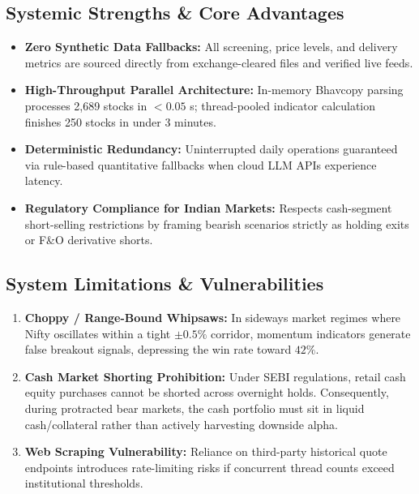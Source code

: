 \documentclass[11pt,a4paper]{article}
\begin{document}
\subsection{Systemic Strengths \& Core Advantages}
\begin{itemize}[leftmargin=*]
    \item \textbf{Zero Synthetic Data Fallbacks:} All screening, price levels, and delivery metrics are sourced directly from exchange-cleared files and verified live feeds.
    \item \textbf{High-Throughput Parallel Architecture:} In-memory Bhavcopy parsing processes 2,689 stocks in $< 0.05$ s; thread-pooled indicator calculation finishes 250 stocks in under 3 minutes.
    \item \textbf{Deterministic Redundancy:} Uninterrupted daily operations guaranteed via rule-based quantitative fallbacks when cloud LLM APIs experience latency.
    \item \textbf{Regulatory Compliance for Indian Markets:} Respects cash-segment short-selling restrictions by framing bearish scenarios strictly as holding exits or F\&O derivative shorts.
\end{itemize}

\subsection{System Limitations \& Vulnerabilities}
\begin{enumerate}[leftmargin=*]
    \item \textbf{Choppy / Range-Bound Whipsaws:} In sideways market regimes where Nifty oscillates within a tight $\pm 0.5\%$ corridor, momentum indicators generate false breakout signals, depressing the win rate toward $42\%$.
    \item \textbf{Cash Market Shorting Prohibition:} Under SEBI regulations, retail cash equity purchases cannot be shorted across overnight holds. Consequently, during protracted bear markets, the cash portfolio must sit in liquid cash/collateral rather than actively harvesting downside alpha.
    \item \textbf{Web Scraping Vulnerability:} Reliance on third-party historical quote endpoints introduces rate-limiting risks if concurrent thread counts exceed institutional thresholds.
\end{enumerate}
\end{document}
